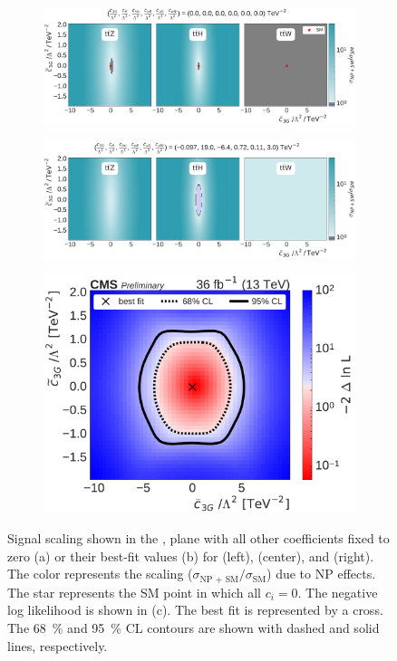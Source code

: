 \begin{figure}
  \vspace{-1cm}
  \begin{subfigure}{\linewidth}
    \centering
    \includegraphics[width=\linewidth]{figures/thirteen-TeV/scaling-frozen/c3G_tc3G}
    \caption{}
  \end{subfigure}
  \begin{subfigure}{\linewidth}
    \centering
    \includegraphics[width=\linewidth]{figures/thirteen-TeV/scaling/c3G_tc3G}
    \caption{}
  \end{subfigure}
  \begin{subfigure}{\linewidth}
    \centering
    \includegraphics[width=0.6\linewidth]{figures/thirteen-TeV/nll/c3G_tc3G}
    \caption{}
  \end{subfigure}
  \vspace{-1cm}
  \setlength{\capwidth}{15cm}
  \caption[Signal scaling and profile likelihood scan in the \cthreeG, \tcthreeG plane]{Signal scaling shown in the \cthreeG, \tcthreeG plane with all other coefficients fixed to zero (a) or their best-fit values (b) for \ttZ (left), \ttH (center), and \ttW (right). The color represents the scaling ($\sigma_\text{NP + SM} / \sigma_\text{SM}$) due to NP effects. The star represents the SM point in which all $c_i=0$. The negative log likelihood is shown in (c). The best fit is represented by a cross. The \SI{68}{\percent} and \SI{95}{\percent} CL contours are shown with dashed and solid lines, respectively.}
\end{figure}

